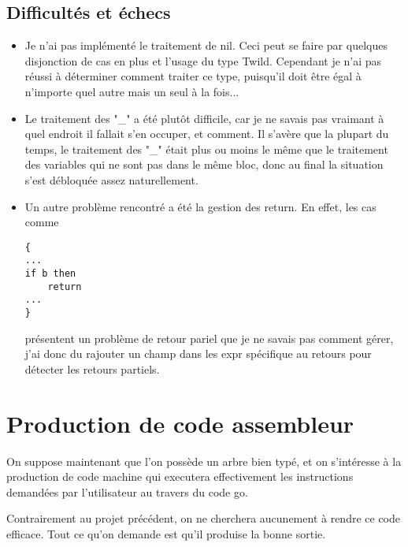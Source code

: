\documentclass{article}
\begin{document}
\subsection{Difficultés et échecs}

\begin{itemize}
\item Je n'ai pas implémenté le traitement de nil. Ceci peut se faire par quelques disjonction de cas en plus et l'usage du type Twild. Cependant je n'ai pas réussi à déterminer comment traiter ce type, puisqu'il doit être égal à n'importe quel autre mais un seul à la fois...\newline
\item Le traitement des "\_" a été plutôt difficile, car je ne savais pas vraimant à quel endroit il fallait s'en occuper, et comment. Il s'avère que la plupart du temps, le traitement des "\_" était plus ou moins le même que le traitement des variables qui ne sont pas dans le même bloc, donc au final la situation s'est débloquée assez naturellement.\newline
\item Un autre problème rencontré a été la gestion des return. En effet, les cas comme 
\begin{lstlisting}
{
...
if b then
    return
...
}
\end{lstlisting}
présentent un problème de retour pariel que je ne savais pas comment gérer, j'ai donc du rajouter un champ dans les expr spécifique au retours pour détecter les retours partiels.
\end{itemize}



\section{Production de code assembleur}

On suppose maintenant que l'on possède un arbre bien typé, et on s'intéresse à la production de code machine qui executera effectivement les instructions demandées par l'utilisateur au travers du code go.

Contrairement au projet précédent, on ne cherchera aucunement à rendre ce code efficace. Tout ce qu'on demande est qu'il produise la bonne sortie.
\end{document}
